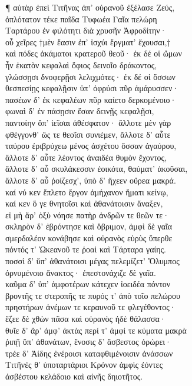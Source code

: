 ¶ αὐτὰρ ἐπεὶ Τιτῆνας ἀπ' οὐρανοῦ ἐξέλασε Ζεύς,  \\
ὁπλότατον τέκε παῖδα Τυφωέα Γαῖα πελώρη\\
Ταρτάρου ἐν φιλότητι διὰ χρυσῆν Ἀφροδίτην· \\
οὗ χεῖρες †μὲν ἔασιν ἐπ' ἰσχύι ἔργματ' ἔχουσαι,†\\
καὶ πόδες ἀκάματοι κρατεροῦ θεοῦ· ἐκ δέ οἱ ὤμων \\
ἦν ἑκατὸν κεφαλαὶ ὄφιος δεινοῖο δράκοντος,  \\
γλώσσῃσι δνοφερῇσι λελιχμότες· ἐκ δέ οἱ ὄσσων \\
θεσπεσίῃς κεφαλῇσιν ὑπ' ὀφρύσι πῦρ ἀμάρυσσεν· \\
πασέων δ' ἐκ κεφαλέων πῦρ καίετο δερκομένοιο· \\
φωναὶ δ' ἐν πάσῃσιν ἔσαν δεινῇς κεφαλῇσι,\\
παντοίην ὄπ' ἰεῖσαι ἀθέσφατον· ἄλλοτε μὲν γὰρ  \\
φθέγγονθ' ὥς τε θεοῖσι συνιέμεν, ἄλλοτε δ' αὖτε\\
ταύρου ἐριβρύχεω μένος ἀσχέτου ὄσσαν ἀγαύρου, \\
ἄλλοτε δ' αὖτε λέοντος ἀναιδέα θυμὸν ἔχοντος,\\
ἄλλοτε δ' αὖ σκυλάκεσσιν ἐοικότα, θαύματ' ἀκοῦσαι,\\
ἄλλοτε δ' αὖ ῥοίζεσχ', ὑπὸ δ' ἤχεεν οὔρεα μακρά. \\
καί νύ κεν ἔπλετο ἔργον ἀμήχανον ἤματι κείνῳ,\\
καί κεν ὅ γε θνητοῖσι καὶ ἀθανάτοισιν ἄναξεν,\\
εἰ μὴ ἄρ' ὀξὺ νόησε πατὴρ ἀνδρῶν τε θεῶν τε· \\
σκληρὸν δ' ἐβρόντησε καὶ ὄβριμον, ἀμφὶ δὲ γαῖα\\
σμερδαλέον κονάβησε καὶ οὐρανὸς εὐρὺς ὕπερθε \\
πόντός τ' Ὠκεανοῦ τε ῥοαὶ καὶ Τάρταρα γαίης. \\
ποσσὶ δ' ὕπ' ἀθανάτοισι μέγας πελεμίζετ' Ὄλυμπος\\
ὀρνυμένοιο ἄνακτος· ἐπεστονάχιζε δὲ γαῖα.\\
καῦμα δ' ὑπ' ἀμφοτέρων κάτεχεν ἰοειδέα πόντον\\
βροντῆς τε στεροπῆς τε πυρός τ' ἀπὸ τοῖο πελώρου  \\
πρηστήρων ἀνέμων τε κεραυνοῦ τε φλεγέθοντος· \\
ἔζεε δὲ χθὼν πᾶσα καὶ οὐρανὸς ἠδὲ θάλασσα· \\
θυῖε δ' ἄρ' ἀμφ' ἀκτὰς περί τ' ἀμφί τε κύματα μακρὰ\\
ῥιπῇ ὕπ' ἀθανάτων, ἔνοσις δ' ἄσβεστος ὀρώρει· \\
τρέε δ' Ἀίδης ἐνέροισι καταφθιμένοισιν ἀνάσσων \\
Τιτῆνές θ' ὑποταρτάριοι Κρόνον ἀμφὶς ἐόντες \\
ἀσβέστου κελάδοιο καὶ αἰνῆς δηιοτῆτος. 

